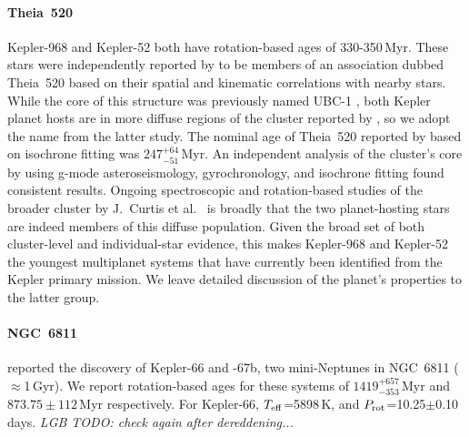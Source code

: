 \documentclass[11pt,twocolumn,tighten]{aastex63}
\begin{document}
\paragraph{Theia~520}
Kepler-968 and Kepler-52 both have rotation-based ages of
330-350\,Myr.  These stars were independently reported by
\citet{2019AJ....158..122K} to be members of an association dubbed
Theia~520 based on their spatial and kinematic correlations with
nearby stars.  While the core of this structure was previously named
UBC-1 \citep{2018A&A...618A..59C}, both Kepler planet hosts are in
more diffuse regions of the cluster reported by
\citet{2019AJ....158..122K}, so we adopt the name from the latter
study.  The nominal age of Theia~520 reported by
\citet{2019AJ....158..122K} based on isochrone fitting was
$247^{+64}_{-51}$\,Myr.  An independent analysis of the cluster's core
by \citet{2024A&A...681A..13F} using g-mode asteroseismology,
gyrochronology, and isochrone fitting found consistent results.
Ongoing spectroscopic and rotation-based studies of the broader
cluster by J.~Curtis et al.~ is broadly that the two planet-hosting
stars are indeed members of this diffuse population.  Given the broad
set of both cluster-level and individual-star evidence, this makes
Kepler-968 and Kepler-52 the youngest multiplanet systems that have
currently been identified from the Kepler primary mission.
We leave detailed discussion of the planet's properties to the latter 
group.

\paragraph{NGC~6811}
\citet{Meibom_2013} reported the discovery of Kepler-66 and -67b, two
mini-Neptunes in NGC~6811 ($\approx$1\,Gyr).
We report rotation-based ages for these systems of
$1419^{+657}_{-353}$\,Myr and $873.75\pm{112}$\,Myr respectively.
For Kepler-66, $T_{\rm eff}$=5898\,K, and $P_{\rm
rot}$=10.25$\pm$0.10\,days.
{\it LGB TODO: check again after dereddening...}
\end{document}
